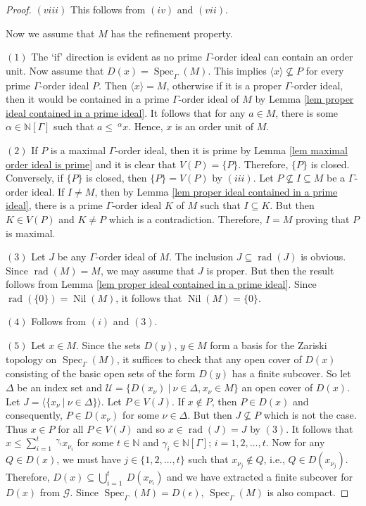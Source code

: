 \documentclass[a4paper,reqno,12pt]{amsart}
\numberwithin{equation}{section}
\theoremstyle{definition}
\theoremstyle{remark}
\newcommand{\rad}{\operatorname{rad}}
\newcommand{\nil}{\operatorname{Nil}}
\newcommand{\Spec}{\operatorname{Spec}}
\begin{document}
\begin{proof}
$(viii)$ This follows from $(iv)$ and $(vii)$. 

Now we assume that $M$ has the refinement property.

$(1)$ The `if' direction is evident as no prime $\Gamma$-order ideal can contain an order unit. Now assume that $D(x)=\Spec_\Gamma(M)$. This implies $\langle x\rangle \nsubseteq P$ for every prime $\Gamma$-order ideal $P$. Then $\langle x\rangle=M$, otherwise if it is a proper $\Gamma$-order ideal, then it would be contained in a prime $\Gamma$-order ideal of $M$ by Lemma \ref{lem proper ideal contained in a prime ideal}. It follows that for any $a\in M$, there is some $\alpha\in \mathbb{N}[\Gamma]$ such that $a\le~^{\alpha}x$. Hence, $x$ is an order unit of $M$.

$(2)$ If $P$ is a maximal $\Gamma$-order ideal, then it is prime by Lemma \ref{lem maximal order ideal is prime} and it is clear that $V(P)=\{P\}$. Therefore, $\{P\}$ is closed. Conversely, if $\{P\}$ is closed, then $\{P\}=V(P)$ by $(iii)$. Let $P\nsubseteq I\subseteq M$ be a $\Gamma$-order ideal. If $I\neq M$, then by Lemma \ref{lem proper ideal contained in a prime ideal}, there is a prime $\Gamma$-order ideal $K$ of $M$ such that $I\subseteq K$. But then $K\in V(P)$ and $K\neq P$ which is a contradiction. Therefore, $I=M$ proving that $P$ is maximal. 

$(3)$ Let $J$ be any $\Gamma$-order ideal of $M$. The inclusion $J\subseteq \rad(J)$ is obvious. Since $\rad(M)=M$, we may assume that $J$ is proper. But then the result follows from Lemma \ref{lem proper ideal contained in a prime ideal}. Since $\rad(\{0\})=\nil(M)$, it follows that $\nil(M)=\{0\}$. 

$(4)$ Follows from $(i)$ and $(3)$.

$(5)$ Let $x\in M$. Since the sets $D(y)$, $y\in M$ form a basis for the Zariski topology on $\Spec_\Gamma(M)$, it suffices to check that any open cover of $D(x)$ consisting of the basic open sets of the form $D(y)$ has a finite subcover. So let $\Delta$ be an index set and $\mathcal{U}=\{D(x_\nu)~|~\nu\in \Delta,x_\nu\in M\}$ an open cover of $D(x)$. Let $J=\langle \{x_\nu~|~\nu\in \Delta\}\rangle$. Let $P\in V(J)$. If $x\notin P$, then $P\in D(x)$ and consequently, $P\in D(x_\nu)$ for some $\nu\in \Delta$. But then $J\nsubseteq P$ which is not the case. Thus $x\in P$ for all $P\in V(J)$ and so $x\in \rad(J)=J$ by $(3)$. It follows that $x\le \displaystyle{\sum_{i=1}^{t}}~^{\gamma_i}x_{\nu_i}$ for some $t\in \mathbb{N}$ and $\gamma_i\in \mathbb{N}[\Gamma]$; $i=1,2,\ldots,t$. Now for any $Q\in D(x)$, we must have $j\in \{1,2,\ldots,t\}$ such that $x_{\nu_j}\notin Q$, i.e., $Q\in D(x_{\nu_j})$. Therefore, $D(x)\subseteq \displaystyle{\bigcup_{i=1}^{t}}~D(x_{\nu_i})$ and we have extracted a finite subcover for $D(x)$ from $\mathcal{G}$. Since $\Spec_\Gamma(M)=D(\epsilon)$, $\Spec_\Gamma(M)$ is also compact.


\end{proof}
\end{document}
